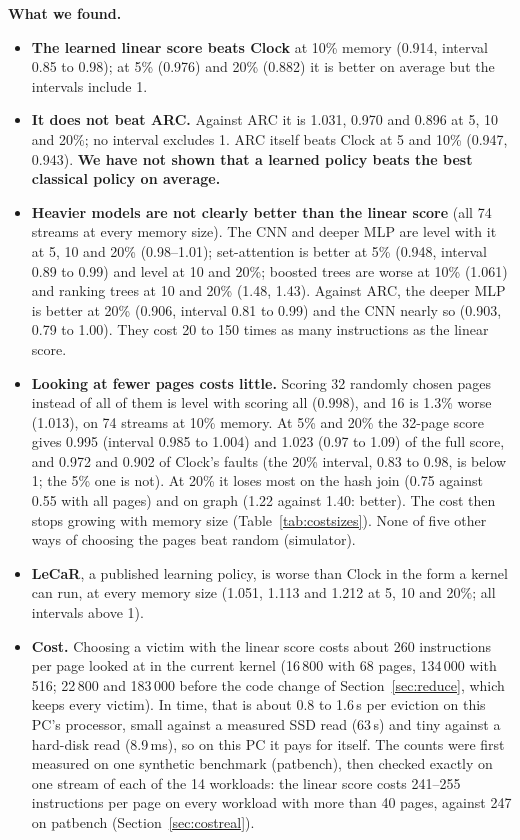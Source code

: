 \documentclass[10.5pt,a4paper]{article}
\begin{document}
\textbf{What we found.}
\begin{itemize}
\item \textbf{The learned linear score beats Clock} at 10\% memory (0.914, interval 0.85 to 0.98); at 5\% (0.976) and 20\% (0.882) it is better on average but the intervals include 1.
\item \textbf{It does not beat ARC.} Against ARC it is 1.031, 0.970 and 0.896 at 5, 10 and 20\%; no interval excludes 1. ARC itself beats Clock at 5 and 10\% (0.947, 0.943).
  \textbf{We have not shown that a learned policy beats the best classical policy on average.}
\item \textbf{Heavier models are not clearly better than the linear score} (all 74 streams at every memory size). The CNN and deeper MLP are level with it at 5, 10 and 20\% (0.98--1.01); set-attention is better at 5\% (0.948, interval 0.89 to 0.99) and level at 10 and 20\%; boosted trees are worse at 10\% (1.061) and ranking trees at 10 and 20\% (1.48, 1.43).
  Against ARC, the deeper MLP is better at 20\% (0.906, interval 0.81 to 0.99) and the CNN nearly so (0.903, 0.79 to 1.00). They cost 20 to 150 times as many instructions as the linear score.
\item \textbf{Looking at fewer pages costs little.} Scoring 32 randomly chosen pages instead of all of them is level with scoring all (0.998), and 16 is 1.3\% worse (1.013), on 74 streams at 10\% memory.
  At 5\% and 20\% the 32-page score gives 0.995 (interval 0.985 to 1.004) and 1.023 (0.97 to 1.09) of the full score, and 0.972 and 0.902 of Clock's faults (the 20\% interval, 0.83 to 0.98, is below 1; the 5\% one is not). At 20\% it loses most on the hash join (0.75 against 0.55 with all pages) and on graph (1.22 against 1.40: better).
  The cost then stops growing with memory size (Table~\ref{tab:costsizes}). None of five other ways of choosing the pages beat random (simulator).
\item \textbf{LeCaR}, a published learning policy, is worse than Clock in the form a kernel can run, at every memory size (1.051, 1.113 and 1.212 at 5, 10 and 20\%; all intervals above 1).
\item \textbf{Cost.} Choosing a victim with the linear score costs about 260 instructions per page looked at in the current kernel (16\,800 with 68 pages, 134\,000 with 516; 22\,800 and 183\,000 before the code change of Section~\ref{sec:reduce}, which keeps every victim). In time, that is about 0.8 to 1.6\,\textmu s per eviction on this PC's processor,
  small against a measured SSD read (63\,\textmu s) and tiny against a hard-disk read (8.9\,ms), so on this PC it pays for itself. The counts were first measured on one synthetic benchmark (patbench), then checked exactly on one stream of each of the 14 workloads: the linear score costs 241--255 instructions per page on every workload with more than 40 pages, against 247 on patbench (Section~\ref{sec:costreal}).
\end{itemize}
\end{document}
